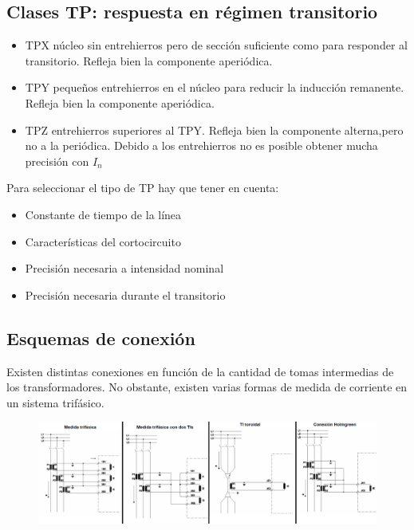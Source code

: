 \subsection{Clases TP: respuesta en régimen transitorio}
\begin{itemize}
	\item TPX núcleo sin entrehierros pero de sección suficiente como para responder al transitorio. Refleja bien la componente aperiódica. 
	\item TPY pequeños entrehierros en el núcleo para reducir la inducción remanente. Refleja bien la componente aperiódica.
	\item TPZ entrehierros superiores al TPY. Refleja bien la componente alterna,pero no a la periódica. Debido a los entrehierros no es posible obtener mucha precisión con $I_n$
\end{itemize}

Para seleccionar el tipo de TP hay que tener en cuenta:
\begin{itemize}
	\item Constante de tiempo de la línea
	\item Características del cortocircuito
	\item Precisión necesaria a intensidad nominal
	\item Precisión necesaria durante el transitorio
\end{itemize}


\subsection{Esquemas de conexión}
Existen distintas conexiones en función de la cantidad de tomas intermedias de los transformadores. No obstante, existen varias formas de medida de corriente en un sistema trifásico.
\begin{figure}[H]
	\centering
	\includegraphics[width=1\linewidth]{Images/49}
	\label{fig:49}
\end{figure}
